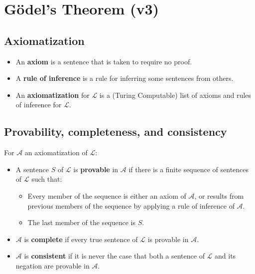 \documentclass[12pt]{extarticle}
\begin{document}
\section{G\"odel's Theorem (v3)}



\subsection{Axiomatization}


\begin{itemize}
\item An \textbf{axiom} is a sentence that is taken to require no proof.

\item A \textbf{rule of inference} is a rule for inferring some sentences from others.

\item An \textbf{axiomatization} for $\mathcal{L}$ is a (Turing Computable) list of axioms and rules of inference for $\mathcal{L}$.

\end{itemize}


\subsection{Provability, completeness, and consistency}

For $\mathcal{A}$ an axiomatization of $\mathcal{L}$:
\begin{itemize}

\item A sentence \(S\) of  $\mathcal{L}$ is \textbf{provable} in  $\mathcal{A}$ if there is a finite sequence of sentences of  $\mathcal{L}$ such that:
\begin{itemize}
\item Every member of the sequence is either an axiom of  $\mathcal{A}$, or results from previous members of the sequence by applying a rule of inference of  $\mathcal{A}$.

\item The last member of the sequence is \(S\).

\end{itemize}

\item  $\mathcal{A}$ is \textbf{complete} if every true sentence of  $\mathcal{L}$ is provable in  $\mathcal{A}$.

\item  $\mathcal{A}$ is \textbf{consistent} if it is never the case that both a sentence of  $\mathcal{L}$ and its negation are provable in  $\mathcal{A}$.


\end{itemize}
\end{document}
